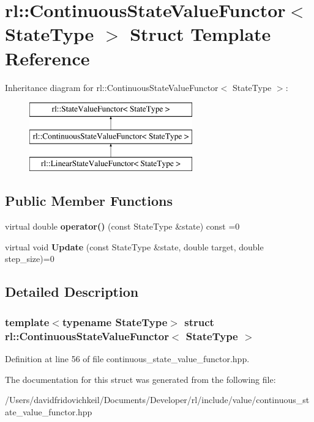 \hypertarget{structrl_1_1_continuous_state_value_functor}{}\section{rl\+:\+:Continuous\+State\+Value\+Functor$<$ State\+Type $>$ Struct Template Reference}
\label{structrl_1_1_continuous_state_value_functor}
Inheritance diagram for rl\+:\+:Continuous\+State\+Value\+Functor$<$ State\+Type $>$\+:\begin{figure}[H]
\begin{center}
\leavevmode
\includegraphics[height=3.000000cm]{structrl_1_1_continuous_state_value_functor}
\end{center}
\end{figure}
\subsection*{Public Member Functions}
\begin{DoxyCompactItemize}
\item 
\hypertarget{structrl_1_1_continuous_state_value_functor_a5d40cf6eb4afb8e1e8a2ea7d52e95aef}{}\label{structrl_1_1_continuous_state_value_functor_a5d40cf6eb4afb8e1e8a2ea7d52e95aef} 
virtual double {\bfseries operator()} (const State\+Type \&state) const =0
\item 
\hypertarget{structrl_1_1_continuous_state_value_functor_ab2e62455723c5642d352a74ae124e456}{}\label{structrl_1_1_continuous_state_value_functor_ab2e62455723c5642d352a74ae124e456} 
virtual void {\bfseries Update} (const State\+Type \&state, double target, double step\+\_\+size)=0
\end{DoxyCompactItemize}


\subsection{Detailed Description}
\subsubsection*{template$<$typename State\+Type$>$\newline
struct rl\+::\+Continuous\+State\+Value\+Functor$<$ State\+Type $>$}



Definition at line 56 of file continuous\+\_\+state\+\_\+value\+\_\+functor.\+hpp.



The documentation for this struct was generated from the following file\+:\begin{DoxyCompactItemize}
\item 
/\+Users/davidfridovichkeil/\+Documents/\+Developer/rl/include/value/continuous\+\_\+state\+\_\+value\+\_\+functor.\+hpp\end{DoxyCompactItemize}
